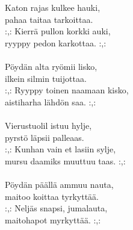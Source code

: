 
            Katon rajas kulkee hauki, \\
            pahaa taitaa tarkoittaa. \\
            :,: Kierrä pullon korkki auki, \\
            ryyppy pedon karkottaa. :,: \\
\hspace{10mm} \\
            Pöydän alta ryömii lisko, \\
            ilkein silmin tuijottaa. \\
            :,: Ryyppy toinen naamaan kisko, \\
            aistiharha lähdön saa. :,: \\
\hspace{10mm} \\
            Vierustuolil istuu hylje, \\
            pyrstö läpsii palleaas. \\
            :,: Kunhan vain et lasiin sylje, \\
            mursu daamiks muuttuu taas. :,: \\
\hspace{10mm} \\
            Pöydän päällä ammuu nauta, \\
            maitoo koittaa tyrkyttää. \\
            :,: Neljäs snapsi, jumalauta, \\
            maitohapot myrkyttää. :,: \\
